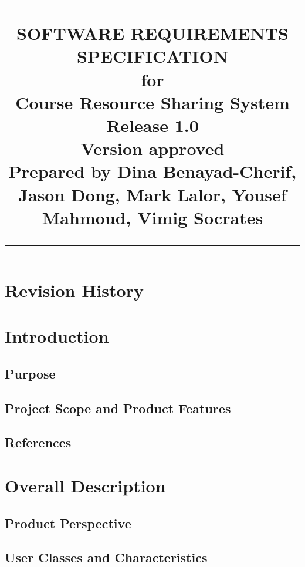 \documentclass{scrreprt}
\title{%
\flushright
\rule{16cm}{5pt}\vskip1cm
\Huge{SOFTWARE REQUIREMENTS\\ SPECIFICATION}\\
\vspace{2cm}
for\\
\vspace{2cm}
Course Resource Sharing System\\
\vspace{2cm}
\LARGE{Release 1.0\\}
\vspace{2cm}
\LARGE{Version \myversion approved\\}
\vspace{2cm}
Prepared by Dina Benayad-Cherif, Jason Dong, Mark Lalor, Yousef Mahmoud, Vimig Socrates\\
\vfill
\rule{16cm}{5pt}
}
\date{}
\begin{document}
\maketitle
\tableofcontents
\chapter*{Revision History}
\chapter{Introduction}
\section{Purpose}
\section{Project Scope and Product Features}
\section{References}
\chapter{Overall Description}
\section{Product Perspective}
\section{User Classes and Characteristics}
\end{document}
